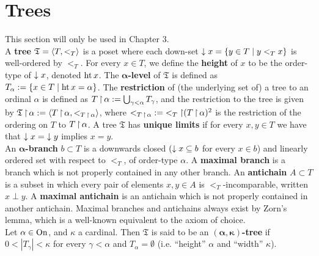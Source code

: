 \section{Trees}
This section will only be used in Chapter 3.\\

A \textbf{tree} $\mathfrak{T}=\langle T,<_T\rangle$ is a poset where each down-set ${\downarrow x}=\{y\in T\mid y<_Tx\}$ is well-ordered by $<_T$. For every $x\in T$, we define the \textbf{height} of $x$ to be the order-type of ${\downarrow x}$, denoted $\operatorname{ht} x$. The \textbf{$\boldsymbol\alpha$-level} of $\mathfrak{T}$ is defined as $T_\alpha:=\{x\in T\mid\operatorname{ht} x=\alpha\}$. The \textbf{restriction} of (the underlying set of) a tree to an ordinal $\alpha$ is defined as $T\operatorname{\upharpoonright}\alpha:=\bigcup_{\gamma<\alpha}T_\gamma$, and the restriction to the tree is given by $\mathfrak{T}\operatorname{\upharpoonright}\alpha:=\langle T\operatorname{\upharpoonright}\alpha,<_{T\operatorname{\upharpoonright}\alpha}\rangle$, where $<_{T\operatorname{\upharpoonright}\alpha}{:=}<_T{\operatorname{\upharpoonright}}{(T\operatorname{\upharpoonright}\alpha)^2}$ is the restriction of the ordering on $T$ to $T\operatorname{\upharpoonright}\alpha$. A tree $\mathfrak{T}$ has \textbf{unique limits} if for every $x,y\in T$ we have that ${\downarrow x}={\downarrow y}$ implies $x=y$.\\

An \textbf{$\boldsymbol\alpha$-branch} $b\subset T$ is a downwards closed $({\downarrow x}\subseteq b$ for every $x\in b$) and linearly ordered set with respect to $<_T$, of order-type $\alpha$. A \textbf{maximal branch} is a branch which is not properly contained in any other branch. An \textbf{antichain} $A\subset T$ is a subset in which every pair of elements $x,y\in A$ is $<_T$-incomparable, written $x\perp y$. A \textbf{maximal antichain} is an antichain which is not properly contained in another antichain. Maximal branches and antichains always exist by Zorn's lemma, which is a well-known equivalent to the axiom of choice.\\


Let $\alpha\in\operatorname{On}$, and $\kappa$ a cardinal. Then $\mathfrak{T}$ is said to be an \textbf{$\boldsymbol{(\alpha,\kappa)}$-tree} if $0<|T_\gamma|<\kappa$ for every $\gamma<\alpha$ and $T_\alpha=\emptyset$ (i.e. ``height'' $\alpha$ and ``width'' $\kappa$).


